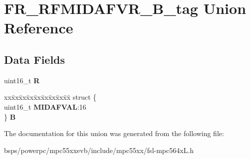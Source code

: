 \hypertarget{unionFR__RFMIDAFVR__16B__tag}{}\section{F\+R\+\_\+\+R\+F\+M\+I\+D\+A\+F\+V\+R\+\_\+B\+\_\+tag Union Reference}
\label{unionFR__RFMIDAFVR__16B__tag}
\subsection*{Data Fields}
\begin{DoxyCompactItemize}
\item 
\mbox{\label{unionFR__RFMIDAFVR__16B__tag_a68a5c9dfe862ea0ce307207aa1e1119b}} 
uint16\+\_\+t {\bfseries R}
\item 
\mbox{\label{unionFR__RFMIDAFVR__16B__tag_a84958a3b77bc4d24be80ed01e121536e}} 
\begin{tabbing}
xx\=xx\=xx\=xx\=xx\=xx\=xx\=xx\=xx\=\kill
struct \{\\
\>uint16\_t {\bfseries MIDAFVAL}:16\\
\} {\bfseries B}\\

\end{tabbing}\end{DoxyCompactItemize}


The documentation for this union was generated from the following file\+:\begin{DoxyCompactItemize}
\item 
bsps/powerpc/mpc55xxevb/include/mpc55xx/fsl-\/mpc564x\+L.\+h\end{DoxyCompactItemize}
